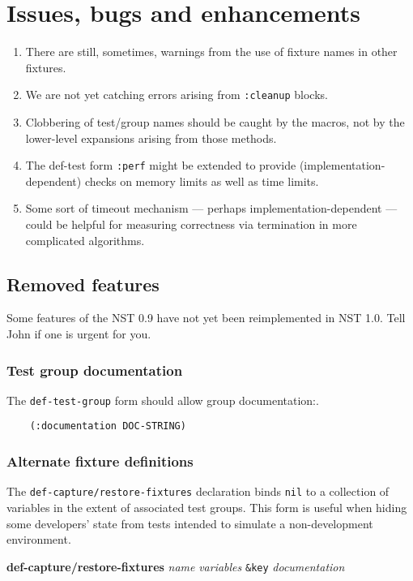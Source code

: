 
\section{Issues, bugs and enhancements}
\begin{enumerate}
\item There are still, sometimes, warnings from the use of fixture
  names in other fixtures.
\item We are not yet catching errors arising from
  \texttt{:cleanup} blocks.
\item Clobbering of test/group names should be caught by the macros,
  not by the lower-level expansions arising from those methods.
\item The def-test form \texttt{:perf} might be extended to provide
  (implementation-dependent) checks on memory limits as well as time
  limits.
\item Some sort of timeout mechanism --- perhaps
  implementation-dependent --- could be helpful for measuring
  correctness via termination in more complicated algorithms.
\end{enumerate}

\subsection{Removed features}
\label{temp-removed}
Some features of the NST 0.9 have not yet been reimplemented in NST
1.0.  Tell John if one is urgent for you.

\subsubsection{Test group documentation}
The \texttt{def-test-group} form should allow group
documentation:.
\begin{verbatim}
    (:documentation DOC-STRING)
\end{verbatim}

\subsubsection{Alternate fixture definitions}
The
\texttt{def-capture/restore-fixtures}
declaration binds \texttt{nil} to a collection of variables in the
extent of associated test groups.  This form is useful when hiding
some developers' state from tests intended to simulate a
non-development environment.
\begin{center}
\textbf{def-capture/restore-fixtures}
 \textit{name} \textit{variables}
\texttt{\&key} \textit{documentation}
\end{center}

